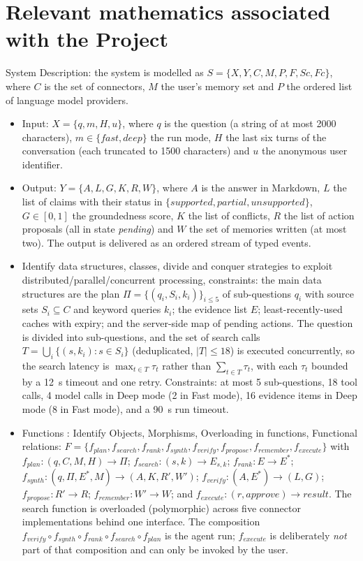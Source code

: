 \documentclass[oneside,a4paper,12pt]{report}
\begin{document}
\section{Relevant mathematics associated with the Project}
\label{sec:math}
System Description: the system is modelled as $S = \{X, Y, C, M, P, F, Sc, Fc\}$, where $C$ is the set of connectors, $M$ the user's memory set and $P$ the ordered list of language model providers.
\begin{itemize}
\item Input: $X = \{q, m, H, u\}$, where $q$ is the question (a string of at most 2000 characters), $m \in \{\mathit{fast}, \mathit{deep}\}$ the run mode, $H$ the last six turns of the conversation (each truncated to 1500 characters) and $u$ the anonymous user identifier.
\item Output: $Y = \{A, L, G, K, R, W\}$, where $A$ is the answer in Markdown, $L$ the list of claims with their status in $\{\mathit{supported}, \mathit{partial}, \mathit{unsupported}\}$, $G \in [0,1]$ the groundedness score, $K$ the list of conflicts, $R$ the list of action proposals (all in state \emph{pending}) and $W$ the set of memories written (at most two). The output is delivered as an ordered stream of typed events.
\item Identify data structures, classes, divide and conquer strategies to exploit distributed/parallel/concurrent processing, constraints: the main data structures are the plan $\Pi = \{(q_i, S_i, k_i)\}_{i \le 5}$ of sub-questions $q_i$ with source sets $S_i \subseteq C$ and keyword queries $k_i$; the evidence list $E$; least-recently-used caches with expiry; and the server-side map of pending actions. The question is divided into sub-questions, and the set of search calls $T = \bigcup_i \{(s, k_i) : s \in S_i\}$ (deduplicated, $|T| \le 18$) is executed concurrently, so the search latency is $\max_{t \in T} \tau_t$ rather than $\sum_{t \in T} \tau_t$, with each $\tau_t$ bounded by a 12~s timeout and one retry. Constraints: at most 5 sub-questions, 18 tool calls, 4 model calls in Deep mode (2 in Fast mode), 16 evidence items in Deep mode (8 in Fast mode), and a 90~s run timeout.
\item Functions : Identify Objects, Morphisms, Overloading in functions, Functional relations: $F = \{f_{plan}, f_{search}, f_{rank}, f_{synth}, f_{verify}, f_{propose}, f_{remember}, f_{execute}\}$ with $f_{plan}: (q, C, M, H) \rightarrow \Pi$; $f_{search}: (s, k) \rightarrow E_{s,k}$; $f_{rank}: E \rightarrow E^{*}$; $f_{synth}: (q, \Pi, E^{*}, M) \rightarrow (A, K, R', W')$; $f_{verify}: (A, E^{*}) \rightarrow (L, G)$; $f_{propose}: R' \rightarrow R$; $f_{remember}: W' \rightarrow W$; and $f_{execute}: (r, \mathit{approve}) \rightarrow \mathit{result}$. The search function is overloaded (polymorphic) across five connector implementations behind one interface. The composition $f_{verify} \circ f_{synth} \circ f_{rank} \circ f_{search} \circ f_{plan}$ is the agent run; $f_{execute}$ is deliberately \emph{not} part of that composition and can only be invoked by the user.

\end{itemize}
\end{document}
